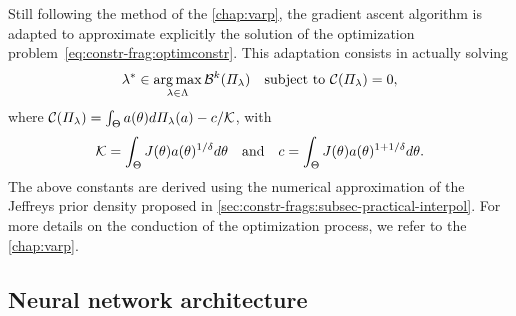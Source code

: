 
Still following the method of the \cref{chap:varp},
the gradient ascent algorithm is adapted to approximate explicitly the solution of the optimization problem~\eqref{eq:constr-frag:optimconstr}.
This adaptation consists in actually solving
    \begin{equation}
        \lambda^\ast\in\operatorname*{arg\,max}_{\lambda\in\Lambda}\mathcal{B}^k(\varPi_\lambda)\quad\text{subject to\ } \mathcal{C}(\varPi_\lambda)=0,
    \end{equation}
where $\mathcal{C}(\varPi_\lambda)=\int_\Theta a(\theta)d\varPi_\lambda(a) - c/\mathcal{K}$, with
    \begin{equation}
        \mathcal{K}=\int_\Theta J(\theta)a(\theta)^{1/\delta}d\theta \quad\text{and}\quad
        c = \int_\Theta J(\theta)a(\theta)^{1+1/\delta}d\theta.
    \end{equation}
The above constants are derived using the numerical approximation of the Jeffreys prior density proposed in \cref{sec:constr-frags:subsec-practical-interpol}.
For more details on the conduction of the optimization process, we refer to the \cref{chap:varp}.



\subsection{Neural network architecture}\label{sec:constr-frags:architecture}


